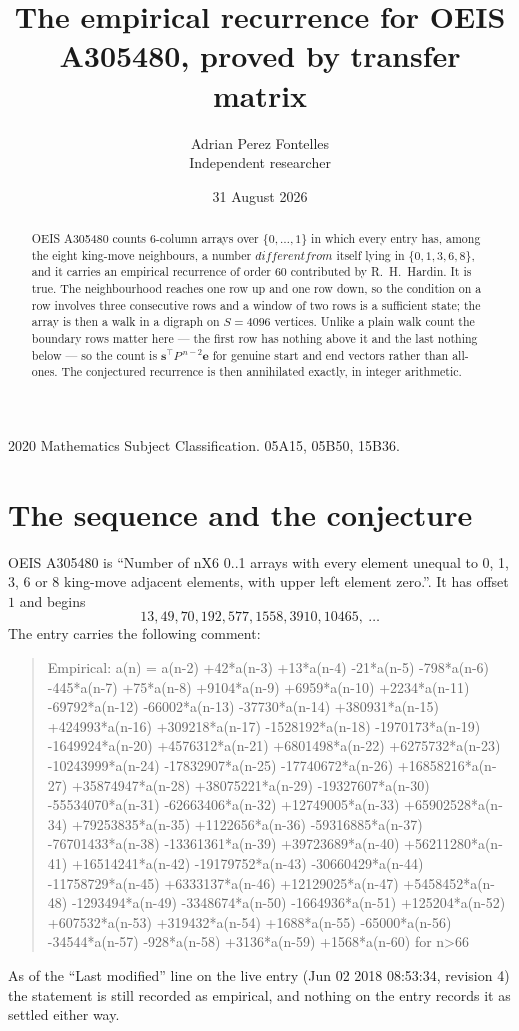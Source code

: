 \documentclass[11pt,a4paper]{article}
\title{The empirical recurrence for OEIS A305480, proved by transfer matrix}
\author{Adrian Perez Fontelles\\ \small Independent researcher}
\date{31 August 2026}
\theoremstyle{plain}
\theoremstyle{definition}
\begin{document}
\maketitle

\begin{abstract}
OEIS A305480 counts $6$-column arrays over $\{0,\dots,1\}$ in which every entry has,
among the eight king-move neighbours, a number $different from$ itself lying in $\{0,1,3,6,8\}$, and it carries an empirical
recurrence of order $60$ contributed by R.~H.~Hardin. It is true. The neighbourhood
reaches one row up and one row down, so the condition on a row involves three consecutive
rows and a window of two rows is a sufficient state; the array is then a walk in a digraph
on $S=4096$ vertices. Unlike a plain walk count the boundary rows matter here --- the first
row has nothing above it and the last nothing below --- so the count is
$\mathbf{s}^{\!\top}P^{\,n-2}\mathbf{e}$ for genuine start and end vectors rather than
all-ones. The conjectured recurrence is then annihilated exactly, in integer arithmetic.
\end{abstract}

\noindent\small 2020 Mathematics Subject Classification. 05A15, 05B50, 15B36.\normalsize

\section{The sequence and the conjecture}

OEIS A305480 is ``Number of nX6 0..1 arrays with every element unequal to 0, 1, 3, 6 or 8 king-move adjacent elements, with upper left element zero.''. It has offset
$1$ and begins
\[
13, 49, 70, 192, 577, 1558, 3910, 10465,\ \dots
\]
The entry carries the following comment:
\begin{quote}\small
Empirical: a(n) = a(n-2) +42*a(n-3) +13*a(n-4) -21*a(n-5) -798*a(n-6) -445*a(n-7) +75*a(n-8) +9104*a(n-9) +6959*a(n-10) +2234*a(n-11) -69792*a(n-12) -66002*a(n-13) -37730*a(n-14) +380931*a(n-15) +424993*a(n-16) +309218*a(n-17) -1528192*a(n-18) -1970173*a(n-19) -1649924*a(n-20) +4576312*a(n-21) +6801498*a(n-22) +6275732*a(n-23) -10243999*a(n-24) -17832907*a(n-25) -17740672*a(n-26) +16858216*a(n-27) +35874947*a(n-28) +38075221*a(n-29) -19327607*a(n-30) -55534070*a(n-31) -62663406*a(n-32) +12749005*a(n-33) +65902528*a(n-34) +79253835*a(n-35) +1122656*a(n-36) -59316885*a(n-37) -76701433*a(n-38) -13361361*a(n-39) +39723689*a(n-40) +56211280*a(n-41) +16514241*a(n-42) -19179752*a(n-43) -30660429*a(n-44) -11758729*a(n-45) +6333137*a(n-46) +12129025*a(n-47) +5458452*a(n-48) -1293494*a(n-49) -3348674*a(n-50) -1664936*a(n-51) +125204*a(n-52) +607532*a(n-53) +319432*a(n-54) +1688*a(n-55) -65000*a(n-56) -34544*a(n-57) -928*a(n-58) +3136*a(n-59) +1568*a(n-60) for n>66
\end{quote}
As of the ``Last modified'' line on the live entry (Jun 02 2018 08:53:34, revision
4) the statement is still recorded as empirical, and nothing on the entry
records it as settled either way.
\end{document}
